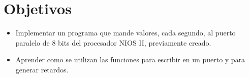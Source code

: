 \section{Objetivos \label{sec:obj}}


\begin{itemize} 
	\item Implementar un programa que mande valores, cada segundo, al puerto
	paralelo de 8 bits del procesador NIOS II, previamente creado.
	\item Aprender como se utilizan las funciones para escribir en un puerto y para generar retardos.	
\end{itemize}